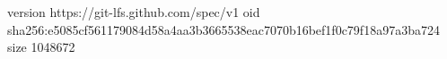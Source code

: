 version https://git-lfs.github.com/spec/v1
oid sha256:e5085cf561179084d58a4aa3b3665538eac7070b16bef1f0c79f18a97a3ba724
size 1048672
